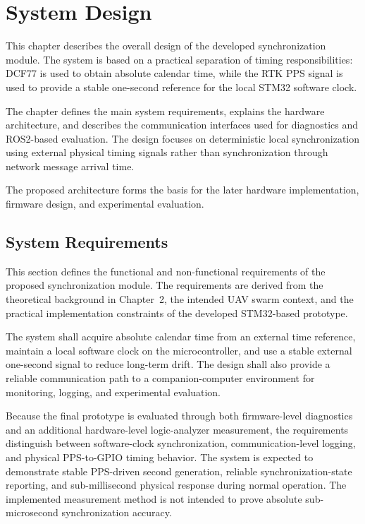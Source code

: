 
\chapter{System Design\label{chap:systemDesign}}

This chapter describes the overall design of the developed synchronization module. The system is based on a practical separation of timing responsibilities: DCF77 is used to obtain absolute calendar time, while the RTK PPS signal is used to provide a stable one-second reference for the local STM32 software clock.

The chapter defines the main system requirements, explains the hardware architecture, and describes the communication interfaces used for diagnostics and ROS2-based evaluation. The design focuses on deterministic local synchronization using external physical timing signals rather than synchronization through network message arrival time.

The proposed architecture forms the basis for the later hardware implementation, firmware design, and experimental evaluation.

\section{System Requirements}

This section defines the functional and non-functional requirements of the proposed synchronization module. The requirements are derived from the theoretical background in Chapter~2, the intended UAV swarm context, and the practical implementation constraints of the developed STM32-based prototype.

The system shall acquire absolute calendar time from an external time reference, maintain a local software clock on the microcontroller, and use a stable external one-second signal to reduce long-term drift. The design shall also provide a reliable communication path to a companion-computer environment for monitoring, logging, and experimental evaluation.

Because the final prototype is evaluated through both firmware-level diagnostics and an additional hardware-level logic-analyzer measurement, the requirements distinguish between software-clock synchronization, communication-level logging, and physical PPS-to-GPIO timing behavior. The system is expected to demonstrate stable PPS-driven second generation, reliable synchronization-state reporting, and sub-millisecond physical response during normal operation. The implemented measurement method is not intended to prove absolute sub-microsecond synchronization accuracy.

